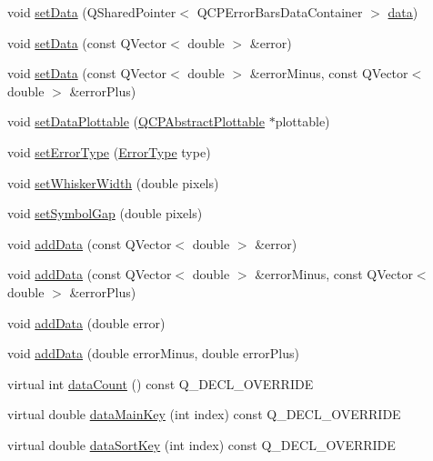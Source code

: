 \begin{DoxyCompactItemize}
\item 
void \hyperlink{classQCPErrorBars_a92b1980003255f5f7c05407a4d92aabc}{set\+Data} (Q\+Shared\+Pointer$<$ Q\+C\+P\+Error\+Bars\+Data\+Container $>$ \hyperlink{classQCPErrorBars_ade69711ef3f9ec10e77d121fa2ba773b}{data})
\item 
void \hyperlink{classQCPErrorBars_a2f33d68a7ec163b09017dce3d9d3abcc}{set\+Data} (const Q\+Vector$<$ double $>$ \&error)
\item 
void \hyperlink{classQCPErrorBars_aac0cf070b957c11177e91b02bcb433c8}{set\+Data} (const Q\+Vector$<$ double $>$ \&error\+Minus, const Q\+Vector$<$ double $>$ \&error\+Plus)
\item 
void \hyperlink{classQCPErrorBars_aabb42a964cfbf780cd1c79850c7cd989}{set\+Data\+Plottable} (\hyperlink{classQCPAbstractPlottable}{Q\+C\+P\+Abstract\+Plottable} $\ast$plottable)
\item 
void \hyperlink{classQCPErrorBars_af0af493d454a8f3a0908830160680d2b}{set\+Error\+Type} (\hyperlink{classQCPErrorBars_a95f0220f11a72648b96480a85ce26474}{Error\+Type} type)
\item 
void \hyperlink{classQCPErrorBars_ad05f6ff9e46c6047f1cd2459744b7b59}{set\+Whisker\+Width} (double pixels)
\item 
void \hyperlink{classQCPErrorBars_a280ee8d863d8a2630c309701d019b3de}{set\+Symbol\+Gap} (double pixels)
\item 
void \hyperlink{classQCPErrorBars_aae296ad9817b3fa418db284af81cecf8}{add\+Data} (const Q\+Vector$<$ double $>$ \&error)
\item 
void \hyperlink{classQCPErrorBars_a2135cf41d7925a3dcdadd4eb03fd3eb6}{add\+Data} (const Q\+Vector$<$ double $>$ \&error\+Minus, const Q\+Vector$<$ double $>$ \&error\+Plus)
\item 
void \hyperlink{classQCPErrorBars_a39ef73b0e61941fc4064fd3a5224c72a}{add\+Data} (double error)
\item 
void \hyperlink{classQCPErrorBars_a1833c5de9c2fe2952b977505d9f27cd1}{add\+Data} (double error\+Minus, double error\+Plus)
\item 
virtual int \hyperlink{classQCPErrorBars_a18b797c62f2af000b926e52eb46d97c7}{data\+Count} () const Q\+\_\+\+D\+E\+C\+L\+\_\+\+O\+V\+E\+R\+R\+I\+DE
\item 
virtual double \hyperlink{classQCPErrorBars_a7cba420078adc523efa59fb8c6ca23e0}{data\+Main\+Key} (int index) const Q\+\_\+\+D\+E\+C\+L\+\_\+\+O\+V\+E\+R\+R\+I\+DE
\item 
virtual double \hyperlink{classQCPErrorBars_a3000a036124880a90c629d124c1cd1e2}{data\+Sort\+Key} (int index) const Q\+\_\+\+D\+E\+C\+L\+\_\+\+O\+V\+E\+R\+R\+I\+DE

\end{DoxyCompactItemize}
